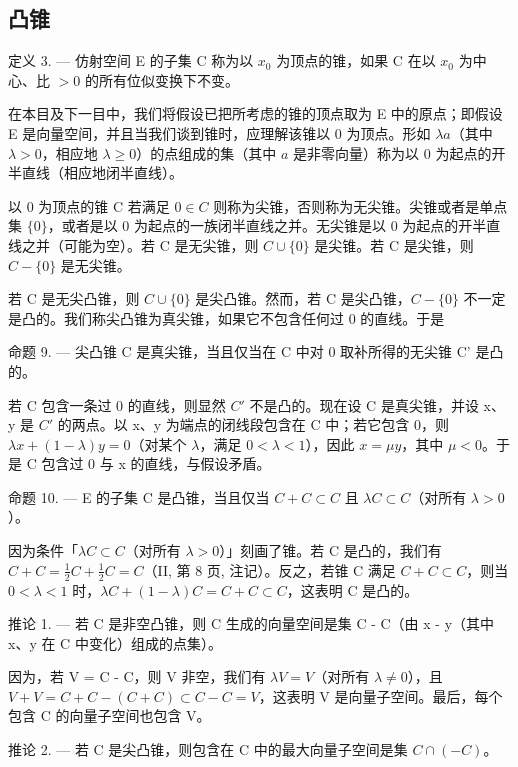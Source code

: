 \subsection{凸锥}

定义 3. --- 仿射空间 E 的子集 C 称为以 \(x_0\) 为顶点的锥，如果 C 在以 \(x_0\) 为中心、比 \(> 0\) 的所有位似变换下不变。

在本目及下一目中，我们将假设已把所考虑的锥的顶点取为 E 中的原点；即假设 E 是向量空间，并且当我们谈到锥时，应理解该锥以 0 为顶点。形如 \(\lambda a\)（其中 \(\lambda > 0\)，相应地 \(\lambda \geqslant 0\)）的点组成的集（其中 \(a\) 是非零向量）称为以 0 为起点的开半直线（相应地闭半直线）。

以 0 为顶点的锥 C 若满足 \(0 \in C\) 则称为尖锥，否则称为无尖锥。尖锥或者是单点集 \(\{0\}\)，或者是以 0 为起点的一族闭半直线之并。无尖锥是以 0 为起点的开半直线之并（可能为空）。若 C 是无尖锥，则 \(C \cup \{0\}\) 是尖锥。若 C 是尖锥，则 \(C - \{0\}\) 是无尖锥。

若 C 是无尖凸锥，则 \(C \cup \{0\}\) 是尖凸锥。然而，若 C 是尖凸锥，\(C - \{0\}\) 不一定是凸的。我们称尖凸锥为真尖锥，如果它不包含任何过 0 的直线。于是

命题 9. --- 尖凸锥 C 是真尖锥，当且仅当在 C 中对 0 取补所得的无尖锥 C' 是凸的。

若 C 包含一条过 0 的直线，则显然 \(C'\) 不是凸的。现在设 C 是真尖锥，并设 x、y 是 \(C'\) 的两点。以 x、y 为端点的闭线段包含在 C 中；若它包含 0，则 \(\lambda x + (1 - \lambda)y = 0\)（对某个 \(\lambda\)，满足 \(0 < \lambda < 1\)），因此 \(x = \mu y\)，其中 \(\mu < 0\)。于是 C 包含过 0 与 x 的直线，与假设矛盾。

命题 10. --- E 的子集 C 是凸锥，当且仅当 \(C + C \subset C\) 且 \(\lambda C \subset C\)（对所有 \(\lambda > 0\)）。

因为条件「\(\lambda C \subset C\)（对所有 \(\lambda > 0\)）」刻画了锥。若 C 是凸的，我们有 \(C + C = \frac{1}{2}C + \frac{1}{2}C = C\)（II, 第 8 页, 注记）。反之，若锥 C 满足 \(C + C \subset C\)，则当 \(0 < \lambda < 1\) 时，\(\lambda C + (1 - \lambda)C = C + C \subset C\)，这表明 C 是凸的。

推论 1. --- 若 C 是非空凸锥，则 C 生成的向量空间是集 C - C（由 x - y（其中 x、y 在 C 中变化）组成的点集）。

因为，若 V = C - C，则 V 非空，我们有 \(\lambda V = V\)（对所有 \(\lambda \neq 0\)），且 \(V + V = C + C - (C + C) \subset C - C = V\)，这表明 V 是向量子空间。最后，每个包含 C 的向量子空间也包含 V。

推论 2. --- 若 C 是尖凸锥，则包含在 C 中的最大向量子空间是集 \(C \cap (-C)\)。

